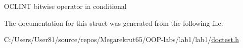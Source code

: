 O\+C\+L\+I\+NT bitwise operator in conditional 

The documentation for this struct was generated from the following file\+:\begin{DoxyCompactItemize}
\item 
C\+:/\+Users/\+User81/source/repos/\+Megarekrut65/\+O\+O\+P-\/labs/lab1/lab1/\mbox{\hyperlink{doctest_8h}{doctest.\+h}}\end{DoxyCompactItemize}
